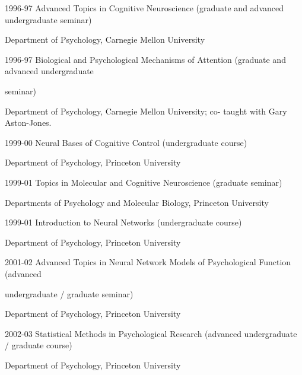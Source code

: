 \documentclass[10 pt]{article}
\begin{document}
1996-97 \hspace{0.3in} Advanced Topics in Cognitive Neuroscience (graduate and advanced undergraduate seminar)

\hspace{0.81in} Department of Psychology, Carnegie Mellon University
    \smallskip

1996-97 \hspace{0.3in} Biological and Psychological Mechanisms of Attention (graduate and advanced undergraduate

\hspace{0.81in} seminar)

\hspace{0.81in} Department of Psychology, Carnegie Mellon University; co-
taught with Gary Aston-Jones.
    \smallskip

1999-00 \hspace{0.3in} Neural Bases of Cognitive Control (undergraduate course)

\hspace{0.81in} Department of Psychology, Princeton University
    \smallskip

1999-01 \hspace{0.3in} Topics in Molecular and Cognitive Neuroscience (graduate seminar)

\hspace{0.81in} Departments of Psychology and Molecular Biology, Princeton University
    \smallskip

1999-01 \hspace{0.3in} Introduction to Neural Networks (undergraduate course)

\hspace{0.81in} Department of Psychology, Princeton University
    \smallskip

2001-02 \hspace{0.3in} Advanced Topics in Neural Network Models of Psychological Function (advanced

\hspace{0.81in} undergraduate / graduate seminar)

\hspace{0.81in} Department of Psychology, Princeton University
    \smallskip

2002-03 \hspace{0.3in} Statistical Methods in Psychological Research (advanced undergraduate / graduate course)

\hspace{0.81in} Department of Psychology, Princeton University
    \smallskip
\end{document}

